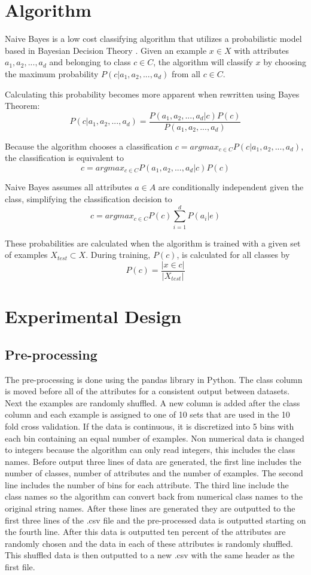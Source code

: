 \documentclass[twoside,11pt]{article}
\begin{document}
\section{Algorithm}

Naive Bayes is a low cost classifying algorithm that utilizes a probabilistic model based in Bayesian Decision Theory \citep{nbPaper:2014}. Given an example $x \in X$ with attributes $a_1, a_2, ..., a_d$ and belonging to class $c \in C$, the algorithm will classify $x$ by choosing the maximum probability $P(c|a_1, a_2, ..., a_d)$ from all $c \in C$.

Calculating this probability becomes more apparent when rewritten using Bayes Theorem:
$$P(c|a_1, a_2, ..., a_d) = \frac{P(a_1, a_2, ..., a_d | c)P(c)}{P(a_1, a_2, ..., a_d)} $$

Because the algorithm chooses a classification $c = argmax_{c \in C}P(c|a_1, a_2, ..., a_d)$, the classification is equivalent to
$$c = argmax_{c \in C}P(a_1, a_2, ..., a_d | c)P(c)$$

Naive Bayes assumes all attributes $a \in A$ are conditionally independent given the class, simplifying the classification decision to 
$$c = argmax_{c \in C}P(c)\sum_{i = 1}^{d}P(a_i | e)$$

These probabilities are calculated when the algorithm is trained with a given set of examples $X_{test} \subset X$. During training, $P(c)$, is calculated for all classes by
$$P(c) = \frac{|x \in c|}{|X_{test}|}$$ 

\section{Experimental Design}

\subsection{Pre-processing}
The pre-processing is done using the pandas library in Python. The class column is moved before all of the attributes for a consistent output between datasets. Next the examples are randomly shuffled. A new column is added after the class column and each example is assigned to one of 10 sets that are used in the 10 fold cross validation. If the data is continuous, it is discretized into 5 bins with each bin containing an equal number of examples. Non numerical data is changed to integers because the algorithm can only read integers, this includes the class names. Before output three lines of data are generated, the first line includes the number of classes, number of attributes and the number of examples. The second line includes the number of bins for each attribute. The third line include the class names so the algorithm can convert back from numerical class names to the original string names. After these lines are generated they are outputted to the first three lines of the .csv file and the pre-processed data is outputted starting on the fourth line. After this data is outputted ten percent of the attributes are randomly chosen and the data in each of these attributes is randomly shuffled. This shuffled data is then outputted to a new .csv with the same header as the first file.  
\end{document}
